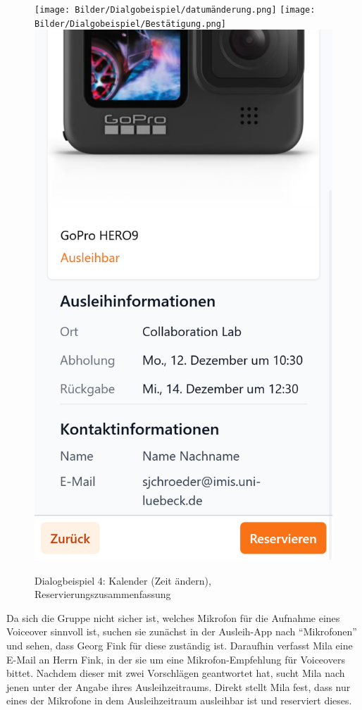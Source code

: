 \begin{figure}[p]
    \centering
    \texttt{[image: Bilder/Dialgobeispiel/datumänderung.png]}
    \texttt{[image: Bilder/Dialgobeispiel/Bestätigung.png]}
    \includegraphics[scale=0.19]{Bilder/Dialgobeispiel/Zsuammenfassung.png}
    \caption{Dialogbeispiel 4: Kalender (Zeit ändern), Reservierungszusammenfassung}\label{fig:geandert}
\end{figure}

Da sich die Gruppe nicht sicher ist, welches Mikrofon für die Aufnahme eines
Voiceover sinnvoll ist, suchen sie zunächst in der Ausleih-App nach \enquote{Mikrofonen} und
sehen, dass Georg Fink für diese zuständig ist. Daraufhin verfasst Mila eine
E-Mail an Herrn Fink, in der sie um eine Mikrofon-Empfehlung für Voiceovers
bittet. Nachdem dieser mit zwei Vorschlägen geantwortet hat, sucht Mila nach
jenen unter der Angabe ihres Ausleihzeitraums. Direkt stellt Mila fest, dass
nur eines der Mikrofone in dem Ausleihzeitraum ausleihbar ist und reserviert
dieses.

